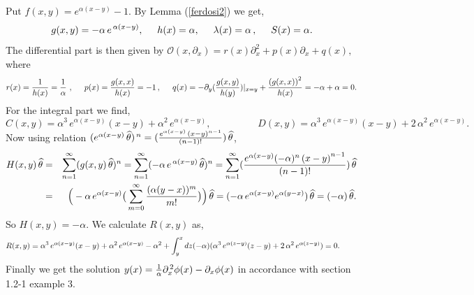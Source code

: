 \documentclass[10pt]{article}
\newcommand{\be}{\begin{equation}}
\newcommand{\ee}{\end{equation}}
\newcommand{\bea}{\begin{eqnarray}}
\newcommand{\eea}{\end{eqnarray}}
\newcommand{\nn}{\nonumber}
\newcommand{\rd}{\partial}
\begin{document}
{{Put $f(x,y)=e^{\alpha(x-y)}-1$. By Lemma (\ref{ferdosi2}) we get,
\be \, g(x,y)=-\alpha\, e^{\,\alpha(x-y)}, \hspace{0.5cm}
h(x)=\alpha, \hspace{0.5cm} \lambda(x)=\alpha\,,\hspace{0.5cm}
S(x)=\alpha.\nn\ee The differential part is then given by $
\mathcal{O}(x,\rd_{x})=r(x)\rd^2_{x}+p(x)\rd_{x}+q(x),$ where \be
r(x)={1\over h(x)}={1\over \alpha}\,\,,\hspace{0.5cm}
p(x)={g(x,x)\over h(x)}=-1\,,\hspace{0.5cm}
q(x)=-\rd_{y}({g(x,y)\over h(y)})|_{x=y}+{{(g(x,x))}^{2}\over
h(x)}=-\alpha+\alpha=0.\nn\ee For the integral part we find, \be
C(x,y)={\alpha}^3\,e^{\alpha(x-y)}(x-y)+{\alpha}^2\,e^{\alpha(x-y)},\hspace{2cm}D(x,y)={\alpha}^3\,e^{\alpha(x-y)}(x-y)+2\,{\alpha}^2\,e^{\alpha(x-y)}.
\nn\ee Now using relation
$(e^{\alpha(x-y)}\,\widehat{\theta})^{\,n}=({e^{\alpha(x-y)}{\,(x-y)}^{n-1}
\over (n-1)!})\,\widehat{\theta}$, \bea
H(x,y)\,\widehat{\theta}&=&\sum^{\infty}_{n=1}(g(x,y)\,\widehat{\theta})^{n}=\sum^{\infty}_{n=1}(-\alpha\,
e^{\,\alpha(x-y)}\,\widehat{\theta})^{n}=\sum^{\infty}_{n=1}({e^{\alpha(x-y)}(-\alpha)^{n}{\,(x-y)}^{n-1}
\over (n-1)!})\,\widehat{\theta}\nn\\
&=&\Big(-\alpha\,e^{\alpha(x-y)}\big(\sum^{\infty}_{m=0}{(\alpha{(y-x)})^{m}
\over
m!}\big)\Big)\,\widehat{\theta}=(-\alpha\,e^{\alpha(x-y)}e^{\alpha(y-x)})
\,\widehat{\theta}=(-\alpha)\,\widehat{\theta}.\nn\eea So
$H(x,y)=-\alpha$. We calculate $R(x,y)$ as, \be
R(x,y)={\alpha}^3\,e^{\alpha(x-y)}(x-y)+{\alpha}^2\,e^{\alpha(x-y)}-{\alpha}^2+\int^{x}_{y}
dz
(-\alpha)({\alpha}^3\,e^{\alpha(z-y)}(z-y)+2\,{\alpha}^2\,e^{\alpha(z-y)})=0.\nn\hspace{0.75cm}\ee
Finally we get  the solution $ y(x)={1\over
\alpha}\rd^{\,2}_{x}\phi(x)-\rd_{x}\phi(x)$ in accordance with
\cite{polyan} section 1.2-1 example 3.

}}
\end{document}
